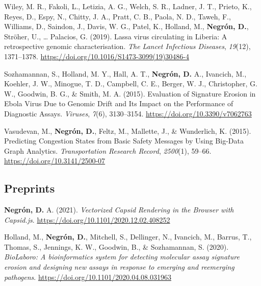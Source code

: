 \documentclass[11pt,a4paper,]{awesome-cv}
\begin{document}
\leavevmode{}%
Wiley, M. R., Fakoli, L., Letizia, A. G., Welch, S. R., Ladner, J. T.,
Prieto, K., Reyes, D., Espy, N., Chitty, J. A., Pratt, C. B., Paola, N.
D., Taweh, F., Williams, D., Saindon, J., Davis, W. G., Patel, K.,
Holland, M., \textbf{Negrón, D.}, Ströher, U., \ldots{} Palacios, G.
(2019). Lassa virus circulating in Liberia: A retrospective genomic
characterisation. \emph{The Lancet Infectious Diseases}, \emph{19}(12),
1371--1378. \url{https://doi.org/10.1016/S1473-3099(19)30486-4}

\leavevmode{}%
Sozhamannan, S., Holland, M. Y., Hall, A. T., \textbf{Negrón, D.} A.,
Ivancich, M., Koehler, J. W., Minogue, T. D., Campbell, C. E., Berger,
W. J., Christopher, G. W., Goodwin, B. G., \& Smith, M. A. (2015).
Evaluation of Signature Erosion in Ebola Virus Due to Genomic Drift and
Its Impact on the Performance of Diagnostic Assays. \emph{Viruses},
\emph{7}(6), 3130--3154. \url{https://doi.org/10.3390/v7062763}

\leavevmode{}%
Vasudevan, M., \textbf{Negrón, D.}, Feltz, M., Mallette, J., \&
Wunderlich, K. (2015). Predicting Congestion States from Basic Safety
Messages by Using Big-Data Graph Analytics. \emph{Transportation
Research Record}, \emph{2500}(1), 59--66.
\url{https://doi.org/10.3141/2500-07}

\hypertarget{preprints}{%
\subsection{Preprints}\label{preprints}}

\hypertarget{bibliography}{}
\leavevmode{}%
\textbf{Negrón, D.} A. (2021). \emph{Vectorized Capsid Rendering in the
Browser with Capsid.js}. \url{https://doi.org/10.1101/2020.12.02.408252}

\leavevmode{}%
Holland, M., \textbf{Negrón, D.}, Mitchell, S., Dellinger, N., Ivancich,
M., Barrus, T., Thomas, S., Jennings, K. W., Goodwin, B., \&
Sozhamannan, S. (2020). \emph{BioLaboro: A bioinformatics system for
detecting molecular assay signature erosion and designing new assays in
response to emerging and reemerging pathogens}.
\url{https://doi.org/10.1101/2020.04.08.031963}
\end{document}
